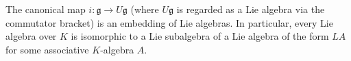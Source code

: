 The canonical map $i: \mathfrak{g} \to U\mathfrak{g}$ (where $U\mathfrak{g}$ is regarded as a Lie algebra via the commutator bracket) is an embedding of Lie algebras. In particular, every Lie algebra over $K$ is isomorphic to a Lie subalgebra of a Lie algebra of the form $LA$ for some associative $K$-algebra $A$.
